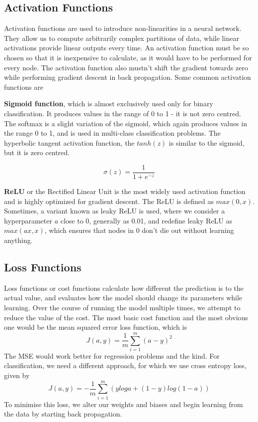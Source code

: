 \documentclass{article}
\begin{document}
\subsection{Activation Functions}

Activation functions are used to introduce non-linearities in a neural network. They allow us to compute arbitrarily complex partitions of data, while linear activations provide linear outputs every time. An activation function must be so chosen so that it is inexpensive to calculate, as it would have to be performed for every node. The activation function also mustn't shift the gradient towards zero while performing gradient descent in back propagation. Some common activation functions are 

\textbf{Sigmoid function}, which is almost exclusively used only for binary classification. It produces values in the range of 0 to 1 - it is not zero centred. The softmax is a slight variation of the sigmoid, which again produces values in the range 0 to 1, and is used in multi-class classification problems. The hyperbolic tangent activation function, the $tanh(z)$ is similar to the sigmoid, but it is zero centred.

$$\sigma(z) = \frac{1}{1+e^{-z}}$$

\textbf{ReLU} or the Rectified Linear Unit is the most widely used activation function and is highly optimized for gradient descent. The ReLU is defined as $max(0, x)$. Sometimes, a variant known as leaky ReLU is used, where we consider a hyperparameter $a$ close to 0, generally as 0.01, and redefine leaky ReLU as $max(ax, x)$, which ensures that nodes in 0 don't die out without learning anything.


\subsection{Loss Functions}

Loss functions or cost functions calculate how different the prediction is to the actual value, and evaluates how the model should change its parameters while learning. Over the course of running the model multiple times, we attempt to reduce the value of the cost. The most basic cost function and the most obvious one would be the mean squared error loss function, which is
$$J(a, y) = \frac{1}{m} \sum_{i=1}^{m}(a-y)^2$$
The MSE would work better for regression problems and the kind. For classification, we need a different approach, for which we use cross entropy loss, given by
$$J(a, y) = -\frac{1}{m} \sum_{i=1}^{m}(y loga + (1-y)log(1-a))$$
To minimise this loss, we alter our weights and biases and begin learning from the data by starting back propagation.
\end{document}
